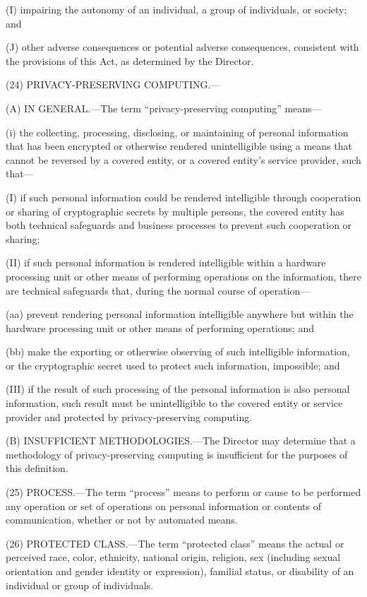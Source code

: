 (I) impairing the autonomy of an individual, a group of individuals, or society; and

(J) other adverse consequences or potential adverse consequences, consistent with the provisions of this Act, as determined by the Director.

(24) PRIVACY-PRESERVING COMPUTING.—

(A) IN GENERAL.—The term “privacy-preserving computing” means—

(i) the collecting, processing, disclosing, or maintaining of personal information that has been encrypted or otherwise rendered unintelligible using a means that cannot be reversed by a covered entity, or a covered entity’s service provider, such that—

(I) if such personal information could be rendered intelligible through cooperation or sharing of cryptographic secrets by multiple persons, the covered entity has both technical safeguards and business processes to prevent such cooperation or sharing;

(II) if such personal information is rendered intelligible within a hardware processing unit or other means of performing operations on the information, there are technical safeguards that, during the normal course of operation—

(aa) prevent rendering personal information intelligible anywhere but within the hardware processing unit or other means of performing operations; and

(bb) make the exporting or otherwise observing of such intelligible information, or the cryptographic secret used to protect such information, impossible; and

(III) if the result of such processing of the personal information is also personal information, such result must be unintelligible to the covered entity or service provider and protected by privacy-preserving computing.

(B) INSUFFICIENT METHODOLOGIES.—The Director may determine that a methodology of privacy-preserving computing is insufficient for the purposes of this definition.

(25) PROCESS.—The term “process” means to perform or cause to be performed any operation or set of operations on personal information or contents of communication, whether or not by automated means.

(26) PROTECTED CLASS.—The term “protected class” means the actual or perceived race, color, ethnicity, national origin, religion, sex (including sexual orientation and gender identity or expression), familial status, or disability of an individual or group of individuals.

